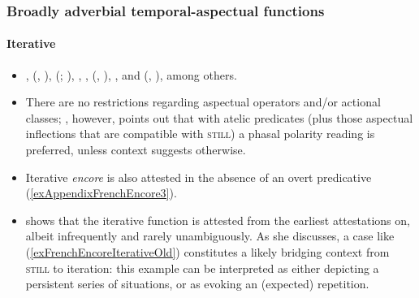 \subsubsection{Broadly adverbial temporal-aspectual functions}
\largerpage
\paragraph{Iterative}
\label{appendixFrenchEncoreIterative}
\begin{itemize}
	\item  \textcite{Borillo1984}, \citeauthor{Fuchs1988} (\citeyear{Fuchs1988}, \citeyear{Fuchs1993}), \citeauthor{MosegaardHansen2002} (\citeyear{MosegaardHansen2002}; \citeyear[155–156]{MosegaardHansen2008}),  \textcite{HoepelmanRohrer1980}, \textcite{Martin1980}, \citeauthor{Muller1975} (\citeyear{Muller1975}, \citeyear{Muller1991}),  \textcite{Nef1981},  \textcite{TovenaDonazzan2008} and \citeauthor{VictorriFuchs1992} (\citeyear{VictorriFuchs1992}, \citeyear{VictorriFuchs1996}), among others.
 	\item There are no restrictions regarding aspectual operators and/or actional classes; \textcite[155 fn19]{MosegaardHansen2008}, however, points out that with atelic predicates (plus those aspectual inflections that are compatible with \textsc{still}) a phasal polarity reading is preferred, unless context suggests otherwise.
	\item Iterative \textit{encore} is also attested in the absence of an overt predicative (\ref{exAppendixFrenchEncore3}). 
	\item \textcite[155–156]{MosegaardHansen2008} shows that the iterative function is attested from the earliest attestations on, albeit infrequently and rarely unambiguously. As she discusses, a case like (\ref{exFrenchEncoreIterativeOld}) constitutes a likely bridging context from \textsc{still} to iteration: this example can be interpreted as either depicting a persistent series of situations, or as evoking an (expected) repetition.
\end{itemize}
